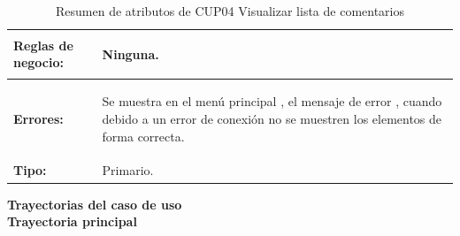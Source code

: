 \begin{table}[H]
\begin{tabular}{| l | p{12 cm} |}
\hline
\textbf{Reglas de negocio:} & \vspace{-2mm}	%
							\begin{compactitem}
								\item Ninguna.
							\end{compactitem}\\							
\hline
\textbf{Errores:} &	\vspace{-2mm}	%
							\begin{compactitem}
								\item  Se muestra en el menú principal \nameref{menu:MP01}, el mensaje de error \nameref{msj:MSG24}, cuando debido a un error de conexión no se muestren los elementos de forma correcta.
							\end{compactitem}\\
\hline
\textbf{Tipo:} & Primario.\\
\hline	
\end{tabular}
\caption{Resumen de atributos de CUP04 Visualizar lista de comentarios}
\label{tab:CUP04}
\end{table} 

\textbf{\textcolor[rgb]{0, 0, 0.545098}{Trayectorias del caso de uso}} \\

\textbf{\large{Trayectoria principal}}

